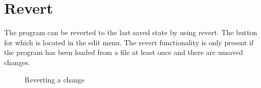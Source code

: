 \section{Revert}

The program can be reverted to the last saved state by using revert. The button for which is located in the edit menu.
The revert functionality is only present if the program has been loaded from a file at least once and there are unsaved changes.
\newline\newline


\begin{figure}[H]
\centering
\caption{Reverting a change}
\label{fig:revert}
\end{figure}
